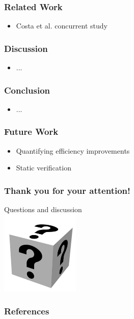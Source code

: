 \documentclass[
	english,
	color={accentcolor=9c},
	logo=true,
	colorframetitle=false
]{../../styles/tuda-ci/tudabeamer}
\begin{document}
	\begin{frame}
		\frametitle{Related Work}
		\begin{itemize}
			\setlength\itemsep{1em}
			\item Costa et al. concurrent study~\cite{costa2020}
		\end{itemize}
	\end{frame}


	\begin{frame}
		\frametitle{Discussion}
		\begin{itemize}
			\setlength\itemsep{1em}
			\item ...
		\end{itemize}
	\end{frame}


	\begin{frame}
		\frametitle{Conclusion}
		\begin{itemize}
			\setlength\itemsep{1em}
			\item ...
		\end{itemize}
	\end{frame}


	\begin{frame}
		\frametitle{Future Work}
		\begin{itemize}
			\setlength\itemsep{1em}
			\item Quantifying efficiency improvements
			\item Static verification
		\end{itemize}
	\end{frame}


	\begin{frame}
		\frametitle{Thank you for your attention!}
		\begin{center}
			\huge Questions and discussion\\
			\vspace{0,6cm}
			\includegraphics[height=4cm]{gfx/faq}
		\end{center}
	\end{frame}


	\begin{frame}[allowframebreaks]
		\frametitle{References}
		
		
	\end{frame}
\end{document}
